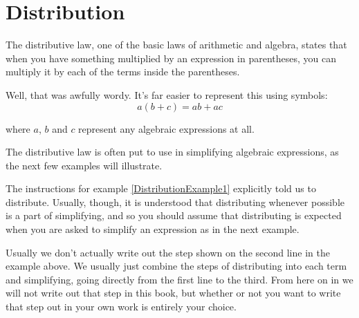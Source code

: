 %
%

\section{Distribution}
\label{Distribution}

The distributive law, one of the basic laws of arithmetic and algebra, states that when you have something multiplied by an expression in parentheses, you can multiply it by each of the terms inside the parentheses.

 Well, that was awfully wordy. It’s far easier to represent this using symbols:
$$a(b+c)=ab+ac$$

where $a$, $b$ and $c$ represent any algebraic expressions at all.

The distributive law is often put to use in simplifying algebraic expressions, as the next few examples will illustrate.



The instructions for example \ref{DistributionExample1} explicitly told us to distribute. Usually, though, it is understood that distributing whenever possible is a part of simplifying, and so you should assume that distributing is expected when you are asked to simplify an expression as in the next example.



Usually we don’t actually write out the step shown on the second line in the example above. We usually just combine the steps of distributing into each term and simplifying, going directly from the first line to the third. From here on in we will not write out that step in this book, but whether or not you want to write that step out in your own work is entirely your choice.

